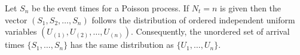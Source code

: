  Let $S_n$ be the event times for a Poisson process. If $N_t = n$ is given then the vector $(S_1, S_2, \ldots, S_n)$ follows the distribution of ordered independent uniform variables $(U_{(1)}, U_{(2)}, \ldots, U_{(n)})$. Consequently, the unordered set of arrival times $\{S_1, \ldots, S_n\}$ has the same distribution as $\{U_1, \ldots, U_n\}$.